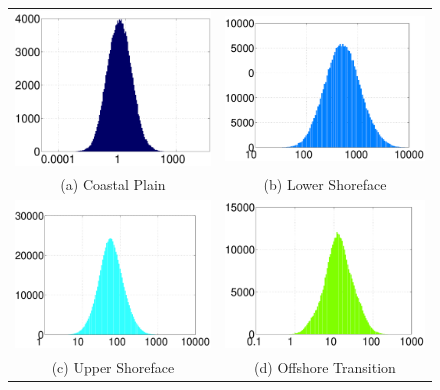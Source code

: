 \begin{figure}
\begin{tabular}{cc}
\includegraphics[width=0.44 \linewidth,natwidth=504bp,natheight=385bp]{./figurer/kxh_1.pdf}&
\includegraphics[width=0.47 \linewidth,natwidth=508bp,natheight=385bp]{./figurer/kxh_2.pdf}\\
(a) Coastal Plain&(b) Lower Shoreface\\
\includegraphics[width=0.47 \linewidth,natwidth=474bp,natheight=399bp]{./figurer/kxh_3.pdf}&
\includegraphics[width=0.45 \linewidth,natwidth=512bp,natheight=385bp]{./figurer/kxh_4.pdf}\\
(c) Upper Shoreface& (d) Offshore Transition\\

\end{tabular}
\end{figure}
